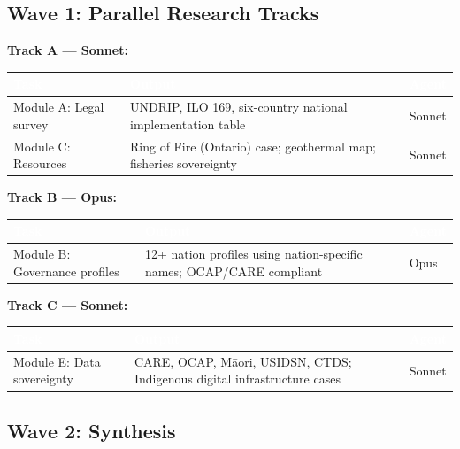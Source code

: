 \documentclass[11pt,letterpaper]{article}
\newcommand{\tableheader}[1]{\textbf{\sffamily\textcolor{white}{#1}}}
\begin{document}
\subsection{Wave 1: Parallel Research Tracks}

\textbf{Track A --- Sonnet:}

\begin{center}
\begin{tabularx}{\textwidth}{L{3cm}XC{2cm}}
\toprule
{}
\tableheader{Task} & \tableheader{Output} & \tableheader{Agent} \\
\midrule
Module A: Legal survey & UNDRIP, ILO 169, six-country national implementation table & Sonnet \\
Module C: Resources & Ring of Fire (Ontario) case; geothermal map; fisheries sovereignty & Sonnet \\
\bottomrule
\end{tabularx}
\end{center}

\textbf{Track B --- Opus:}

\begin{center}
\begin{tabularx}{\textwidth}{L{3cm}XC{2cm}}
\toprule
{}
\tableheader{Task} & \tableheader{Output} & \tableheader{Agent} \\
\midrule
Module B: Governance profiles & 12+ nation profiles using nation-specific names; OCAP/CARE compliant & Opus \\
\bottomrule
\end{tabularx}
\end{center}

\textbf{Track C --- Sonnet:}

\begin{center}
\begin{tabularx}{\textwidth}{L{3cm}XC{2cm}}
\toprule
{}
\tableheader{Task} & \tableheader{Output} & \tableheader{Agent} \\
\midrule
Module E: Data sovereignty & CARE, OCAP, Māori, USIDSN, CTDS; Indigenous digital infrastructure cases & Sonnet \\
\bottomrule
\end{tabularx}
\end{center}

\subsection{Wave 2: Synthesis}
\end{document}
